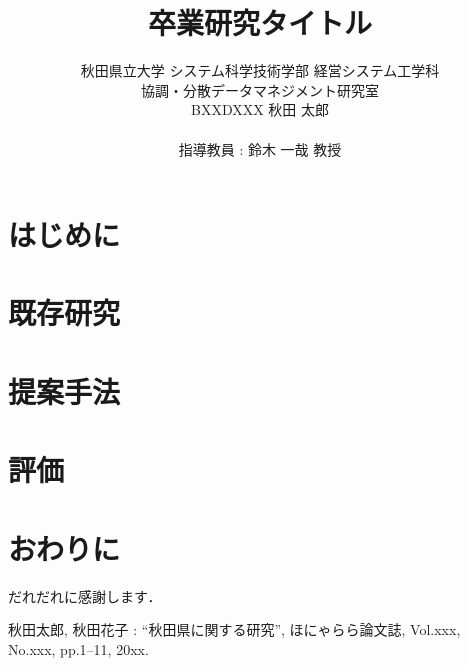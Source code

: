 

\title{卒業研究タイトル}
\author{秋田県立大学 システム科学技術学部 経営システム工学科 \\
協調・分散データマネジメント研究室 \\
BXXDXXX 秋田 太郎 \\ \\ 指導教員 : 鈴木 一哉 教授}

\pagestyle{headings}


\maketitle

\tableofcontents    
\cleardoublepage
{}
\setcounter{page}{1}

\chapter{はじめに}

\chapter{既存研究}

\chapter{提案手法}

\chapter{評価}

\chapter{おわりに}

だれだれに感謝します．

\begin{thebibliography}{99}
    秋田太郎, 秋田花子 : ``秋田県に関する研究'', ほにゃらら論文誌, Vol.xxx, No.xxx, pp.1--11, 20xx.
\end{thebibliography}

